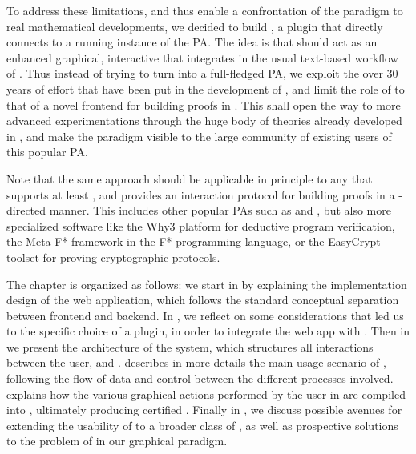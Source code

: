To address these limitations, and thus enable a confrontation of the
 paradigm to real mathematical developments, we decided to build
, a  plugin that directly connects  to a running
instance of the  PA. The idea is that  should act as an enhanced
graphical, interactive  that integrates in the usual text-based
workflow of . Thus instead of trying to turn  into a
full-fledged PA, we exploit the over 30 years of effort that have been put in
the development of , and limit the role of  to that of a novel frontend
for building proofs in . This shall open the way to more advanced
experimentations through the huge body of theories already developed in , and
make the  paradigm visible to the large community of existing
users of this popular PA.

Note that the same approach should be applicable in principle to any  that
supports at least , and provides an interaction protocol for building proofs
in a -directed manner. This includes other popular PAs such as  and
, but also more specialized software like the Why3 platform for
deductive program verification, the Meta-F* framework in the F* programming
language, or the EasyCrypt toolset for proving cryptographic protocols.


The chapter is organized as follows: we start in  by explaining
the implementation design of the  web application, which follows the
standard conceptual separation between frontend and backend. In
, we reflect on some considerations that led us to the
specific choice of a  plugin, in order to integrate the  web app with
. Then in  we present the architecture of the
 system, which structures all interactions between the user,
 and .  describes in more details the main usage
scenario of , following the flow of data and control between
the different processes involved.  explains how the various
graphical actions performed by the user in  are compiled into  ,
ultimately producing certified . Finally in , we
discuss possible avenues for extending the usability of  to a
broader class of  , as well as prospective solutions to the problem of
 in our graphical paradigm.

